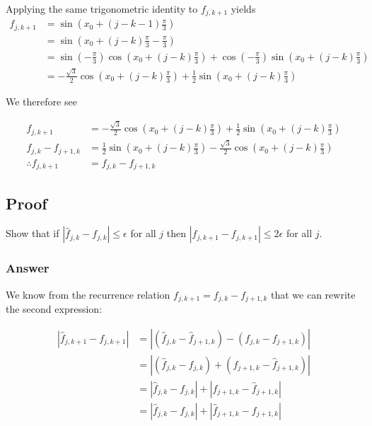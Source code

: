 \documentclass{article}
\begin{document}
		Applying the same trigonometric identity to $f_{j,k+1}$ yields
		\begin{equation}
			\begin{split}
			f_{j,k+1} &= \sin(x_{0}+(j-k-1)\frac{\pi}{3}) \\
			&=\sin(x_{0}+(j-k)\frac{\pi}{3}-\frac{\pi}{3}) \\
			&=\sin(-\frac{\pi}{3})\cos(x_{0}+(j-k)\frac{\pi}{3})+\cos(-\frac{\pi}{3})\sin(x_{0}+(j-k)\frac{\pi}{3})\\
			&=-\frac{\sqrt{3}}{2}\cos(x_{0}+(j-k)\frac{\pi}{3})+\frac{1}{2}\sin(x_{0}+(j-k)\frac{\pi}{3})
			\end{split}
		\end{equation}
		
		We therefore see
		
		\begin{equation}
			\begin{split}
			f_{j,k+1} &= -\frac{\sqrt{3}}{2}\cos(x_{0}+(j-k)\frac{\pi}{3})+\frac{1}{2}\sin(x_{0}+(j-k)\frac{\pi}{3})\\
			f_{j,k}-f_{j+1,k}&=\frac{1}{2}\sin(x_{0}+(j-k)\frac{\pi}{3})-\frac{\sqrt{3}}{2}\cos(x_{0}+(j-k)\frac{\pi}{3})\\
			\therefore f_{j,k+1} &=f_{j,k}-f_{j+1,k}
			\end{split}
		\end{equation}
		
		\subsection{Proof}
		Show that if $|\hat{f}_{j,k}-f_{j,k}|\leq\epsilon$ for all $j$ then $|\hat{f}_{j,k+1}-f_{j,k+1}|\leq2\epsilon$ for all $j$.
		
		\subsubsection{Answer}
		We know from the recurrence relation $f_{j,k+1}=f_{j,k}-f_{j+1,k}$ that we can rewrite the second expression: 
		
		\begin{equation}
			\begin{split}
			|\hat{f}_{j,k+1}-f_{j,k+1}| &= |(\hat{f}_{j,k}-\hat{f}_{j+1,k})-(f_{j,k}-f_{j+1,k})| \\
			&=|(\hat{f}_{j,k}-f_{j,k})+(f_{j+1,k}-\hat{f}_{j+1,k})| \\
			&= |\hat{f}_{j,k}-f_{j,k}|+|f_{j+1,k}-\hat{f}_{j+1,k}|\\
			&=|\hat{f}_{j,k}-f_{j,k}|+|\hat{f}_{j+1,k}-f_{j+1,k}|
			\end{split}
		\end{equation}
	
\end{document}
